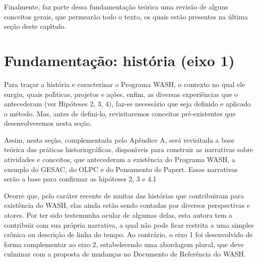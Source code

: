 \documentclass[
12pt,		%
openright,	%
twoside,  %
a4paper,			%
chapter=TITLE,		%
english,			%
french,				%
spanish,			%
brazil				%
]{USPSC-classe/USPSC}
\begin{document}
Finalmente, faz parte dessa fundamenta\c{c}\~ao te\'orica uma revis\~ao de alguns conceitos gerais, que permear\~ao todo o texto, os quais est\~ao presentes na \'ultima se\c{c}\~ao deste cap\'{\i}tulo.








\section[Fundamenta\c{c}\~ao: hist\'oria (eixo 1)]{Fundamenta\c{c}\~ao: hist\'oria (eixo 1)}\label{Fundamenta\c{c}\~ao: hist\'oria (eixo 1)}
Para  tra\c{c}ar a hist\'oria e caracterizar o Programa WASH, o contexto no qual ele surgiu, quais pol\'{\i}ticas, projetos e  a\c{c}\~oes, enfim, as diversas experi\^encias que o antecederam (ver Hip\'oteses 2, 3, 4), faz-se  necess\'ario que seja definido e aplicado o m\'etodo. Mas, antes de defini-lo, revisitaremos conceitos pr\'e-existentes que  desenvolveremos nesta se\c{c}\~ao.








Assim, nesta se\c{c}\~ao, complementada pelo Ap\^endice A, ser\'a revisitada a base te\'orica das pr\'aticas historiogr\'aficas, dispon\'{\i}veis para construir as narrativas sobre atividades e conceitos, que antecederam a exist\^encia do Programa WASH, a exemplo do GESAC, do OLPC e do Pensamento de Papert. Essas narrativas ser\~ao a base para  confirmar as hip\'oteses 2, 3 e 4.1

















Ocorre que, pelo car\'ater recente de muitas das hist\'orias que contribu\'{\i}ram para exist\^encia do WASH, elas ainda est\~ao sendo contadas por diversos perspectivas e atores. Por ter sido testemunha ocular de algumas delas, esta autora tem a contribuir com sua pr\'opria narrativa, a qual n\~ao pode ficar restrita a uma simples cr\^onica ou descri\c{c}\~ao de linha do tempo. Ao contr\'ario, o eixo 1 foi desenvolvido de forma complementar ao eixo 2, estabelecendo uma abordagem plural, que deve culminar com a proposta de mudan\c{c}as no Documento de Refer\^encia do WASH.
\end{document}
